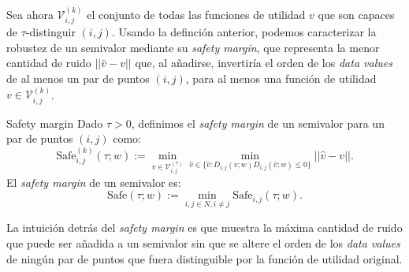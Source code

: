 Sea ahora $\mathcal{V}_{i,j}^{(k)}$ el conjunto de todas las funciones
de utilidad $v$ que son capaces de $\tau$-distinguir $(i,j)$. 
Usando la definción anterior, podemos caracterizar la robustez de
un semivalor mediante su \textit{safety margin}, que representa la
menor cantidad de ruido $||\hat{v} - v||$ que, al añadirse,
invertiría el orden de los \textit{data values} de al menos un
par de puntos $(i,j)$, para al menos una función de utilidad $v \in
\mathcal{V}_{i,j}^{(k)}$.

\begin{definition}{Safety margin}
  Dado $\tau > 0$, definimos el \textit{safety margin} de un
  semivalor para un par de puntos $(i,j)$ como:
  \begin{equation*}
    \text{Safe}_{i,j}^{(k)}(\tau;w):=\min_{v \in \mathcal{V}_{i,j}^{(\tau)}}
    \min_{\hat{v} \in \{\hat{v}:D_{i,j}(v;w)D_{i,j}(\hat{v};w)\leq 0\}}
    ||\hat{v} - v||.
  \end{equation*}
  El \textit{safety margin} de un semivalor es:
  \begin{equation*}
    \text{Safe}(\tau;w):=\min_{i,j \in N, i \neq j} \text{Safe}_{i,j}(\tau;w).
  \end{equation*}
\end{definition}

La intuición detrás del \textit{safety margin} es que muestra
la máxima cantidad de ruido que puede ser añadida a un semivalor sin que
se altere el orden de los \textit{data values} de ningún par de
puntos que fuera distinguible por la función de utilidad original.

